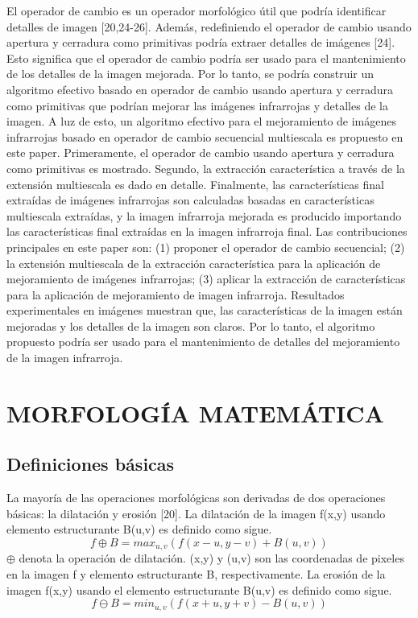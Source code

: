\documentclass[a4paper, 11 pt, conference]{ieeeconf}      %
\begin{document}
El operador de cambio es un operador morfol\'ogico \'util que podr\'ia identificar detalles de imagen [20,24-26]. Adem\'as, redefiniendo el operador de cambio usando apertura y cerradura como primitivas podr\'ia extraer detalles de im\'agenes [24]. Esto significa que el operador de cambio podr\'ia ser usado para el mantenimiento de los detalles de la imagen mejorada. Por lo tanto, se podr\'ia construir un algoritmo efectivo basado en operador de cambio usando apertura y cerradura como primitivas que podr\'ian mejorar las im\'agenes infrarrojas y detalles de la imagen. 
A luz de esto, un algoritmo efectivo para el mejoramiento de im\'agenes infrarrojas basado en operador de cambio secuencial multiescala es propuesto en este paper. Primeramente, el operador de cambio usando apertura y cerradura como primitivas es mostrado. Segundo, la extracci\'on caracter\'istica a trav\'es de la extensi\'on multiescala es dado en detalle. Finalmente, las caracter\'isticas final extra\'idas de im\'agenes infrarrojas son calculadas basadas en caracter\'isticas multiescala extra\'idas, y la imagen infrarroja mejorada es producido importando las caracter\'isticas final extra\'idas en la imagen infrarroja final. Las contribuciones principales en este paper son: (1) proponer el operador de cambio secuencial; (2) la extensi\'on multiescala de la extracci\'on caracter\'istica para la aplicaci\'on de mejoramiento de im\'agenes infrarrojas; (3) aplicar la extracci\'on de caracter\'isticas para la aplicaci\'on de mejoramiento de imagen infrarroja.
Resultados experimentales en im\'agenes muestran que, las caracter\'isticas de la imagen est\'an mejoradas y los detalles de la imagen son claros. Por lo tanto, el algoritmo propuesto podr\'ia ser usado para el mantenimiento de detalles del mejoramiento de la imagen infrarroja.

\section{MORFOLOG\'IA MATEM\'ATICA}

\subsection{Definiciones b\'asicas}

La mayor\'ia de las operaciones morfol\'ogicas son derivadas de dos operaciones b\'asicas: la dilataci\'on y erosi\'on [20]. La dilataci\'on de la imagen f(x,y) usando elemento estructurante B(u,v) es definido como sigue.
$$
f\oplus B = max_{u,v}(f(x-u,y-v) + B(u,v)) 
$$
\( \oplus \) denota la operaci\'on de dilataci\'on. (x,y) y (u,v) son las coordenadas de pixeles en la imagen f y elemento estructurante B, respectivamente. La erosi\'on de la imagen f(x,y) usando el elemento estructurante B(u,v) es definido como sigue.
$$
f \ominus B = min_{u,v}(f(x+u,y+v)-B(u,v))
$$
\end{document}
